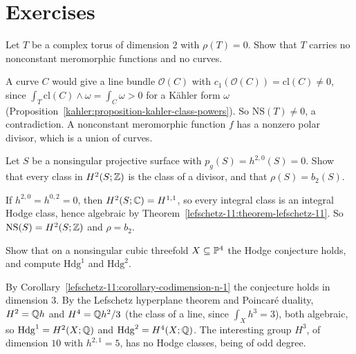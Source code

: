 \section{Exercises}\label{lefschetz-11:section-exercises}

\begin{exercise}\label{lefschetz-11:exercise-picard-number-torus}
Let $T$ be a complex torus of dimension $2$ with $\rho(T) = 0$. Show that $T$ carries no nonconstant meromorphic functions and no curves.
\end{exercise}

\begin{solution}
A curve $C$ would give a line bundle $\mathcal{O}(C)$ with $c_1(\mathcal{O}(C)) = \mathrm{cl}(C) \neq 0$, since $\int_T\mathrm{cl}(C) \wedge \omega = \int_C\omega > 0$ for a K\"ahler form $\omega$
(Proposition~\ref{kahler:proposition-kahler-class-powers}). So $\mathrm{NS}(T) \neq 0$, a contradiction. A nonconstant meromorphic function $f$ has a nonzero polar divisor, which is a union of
curves.
\end{solution}

\begin{exercise}\label{lefschetz-11:exercise-hodge-classes-surface}
Let $S$ be a nonsingular projective surface with $p_g(S) = h^{2,0}(S) = 0$. Show that every class in $H^2(S; \mathbb{Z})$ is the class of a divisor, and that $\rho(S) = b_2(S)$.
\end{exercise}

\begin{solution}
If $h^{2,0} = h^{0,2} = 0$, then $H^2(S; \mathbb{C}) = H^{1,1}$, so every integral class is an integral Hodge class, hence algebraic by Theorem~\ref{lefschetz-11:theorem-lefschetz-11}. So
$\mathrm{NS}(S) = H^2(S; \mathbb{Z})$ and $\rho = b_2$.
\end{solution}

\begin{exercise}\label{lefschetz-11:exercise-cubic-threefold}
Show that on a nonsingular cubic threefold $X \subseteq \mathbb{P}^4$ the Hodge conjecture holds, and compute $\mathrm{Hdg}^1$ and $\mathrm{Hdg}^2$.
\end{exercise}

\begin{solution}
By Corollary~\ref{lefschetz-11:corollary-codimension-n-1} the conjecture holds in dimension $3$. By the Lefschetz hyperplane theorem and Poincar\'e duality, $H^2 = \mathbb{Q} h$ and $H^4 = \mathbb{Q} h^2/3$
(the class of a line, since $\int_Xh^3 = 3$), both algebraic, so $\mathrm{Hdg}^1 = H^2(X; \mathbb{Q})$ and $\mathrm{Hdg}^2 = H^4(X; \mathbb{Q})$. The interesting group $H^3$, of dimension $10$ with $h^{2,1} = 5$, has
no Hodge classes, being of odd degree.
\end{solution}
